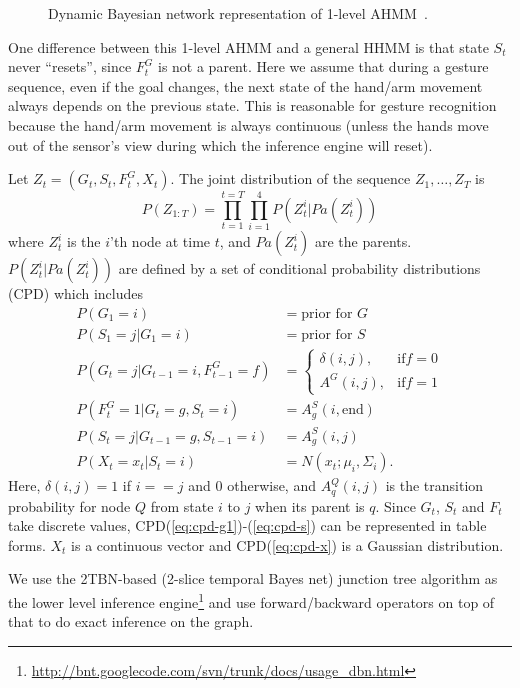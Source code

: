 \documentclass{acm_proc_article-sp}
\begin{document}
\begin{figure}
\centering
{}
\caption{Dynamic Bayesian network representation of 1-level AHMM~\cite{murphy02}.}
\label{fig:ahmm}
\end{figure}

One difference between this 1-level AHMM and a general HHMM is that state $S_t$ never
``resets'', since $F^G_t$ is not a parent. Here we assume that during a gesture sequence, even if the goal changes,
the next state of the hand/arm movement always depends on the previous state. This is reasonable for gesture recognition because the hand/arm 
movement is always continuous (unless the hands move out of the sensor's view during
which the inference engine will reset). 

Let $Z_t = (G_t, S_t, F^G_t, X_t)$. The joint distribution of the sequence $Z_1, \ldots, Z_T$
is
\begin{displaymath}
P(Z_{1:T}) = \prod_{t = 1}^{t = T}\prod_{i = 1}^{4}P(Z_t^i|Pa(Z_t^i))
\end{displaymath}
where $Z_t^i$ is the $i$'th node at time $t$, and $Pa(Z_t^i)$ are the parents. 
$P(Z_t^i|Pa(Z_t^i))$ are defined by a set of conditional probability distributions (CPD) which
includes
\begin{align}
P(G_1 = i) &= \text{prior for } G \label{eq:cpd-g1} \\ 
P(S_1 = j | G_1 = i) &= \text{prior for } S \\
P(G_t = j| G_{t - 1} = i, F_{t - 1}^G = f) &= 
\begin{cases}
  \delta(i, j), & \text{if} f = 0 \\
  A^G(i, j), & \text{if} f = 1 
\end{cases} \label{eq:cpd-g2}\\
P(F_t^G = 1 | G_t = g, S_t = i) &= A_g^S(i, \text{end}) \\
P(S_t = j | G_{t - 1} = g, S_{t - 1} = i) &= A_g^S(i, j) \label{eq:cpd-s}\\
P(X_t = x_t | S_t = i) &= N(x_t; \mu_i, \Sigma_i). \label{eq:cpd-x}
\end{align}
Here, $\delta(i, j) = 1$ if $i == j$ and $0$ otherwise, and $A^Q_q(i, j)$ is the
transition probability for node $Q$ from state $i$ to $j$ when its parent is $q$.
Since $G_t$, $S_t$ and $F_t$ take discrete values, CPD(\ref{eq:cpd-g1})-(\ref{eq:cpd-s})
can be represented in table forms. $X_t$ is a continuous vector and CPD(\ref{eq:cpd-x})
is a Gaussian distribution.

We use the 2TBN-based (2-slice temporal Bayes net)
junction tree algorithm as the lower level inference engine\footnote{\url{http://bnt.googlecode.com/svn/trunk/docs/usage_dbn.html}}  
and use forward/backward operators on top of that to do exact inference on the graph.
\end{document}
